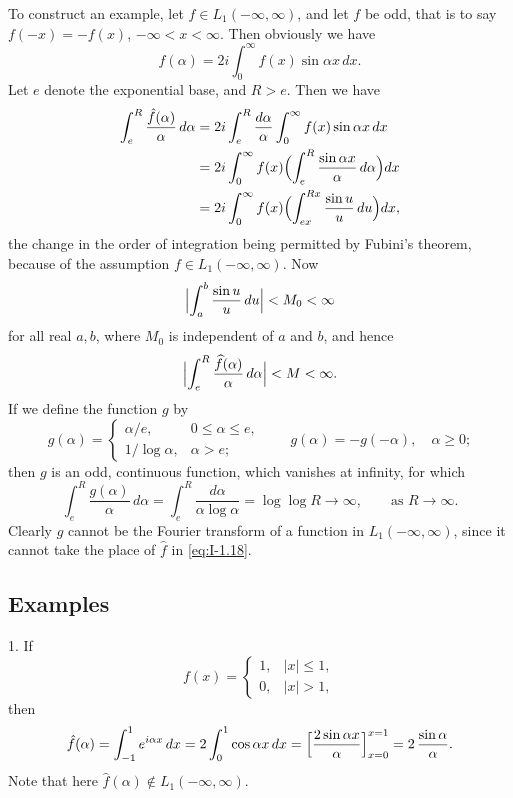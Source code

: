 To construct an example, let $f\in L_1(-\infty,\infty)$, and let $f$ be odd, that is to say $f(-x)=-f(x)$, $-\infty<x<\infty$. Then obviously we have
\begin{equation*}
\hat f(\alpha)=2i\int_0^\infty f(x)\sin\alpha x\,dx.
\end{equation*}
Let $e$ denote the exponential base, and $R>e$. Then we have
\begin{align*}
\int_e^R\frac{\hat f(\alpha)}{\alpha}\,d\alpha
&=2i\int_e^R\frac{d\alpha}{\alpha}\int_0^\infty f(x)\sin\alpha x\,dx\\
&=2i\int_0^\infty f(x)\Bigl(\int_e^R\frac{\sin\alpha x}{\alpha}\,d\alpha\Bigr)dx\\
&=2i\int_0^\infty f(x)\Bigl(\int_{ex}^{Rx}\frac{\sin u}{u}\,du\Bigr)dx,
\end{align*}
the change in the order of integration being permitted by Fubini's theorem, because of the assumption $f\in L_1(-\infty,\infty)$. Now
\begin{equation*}
\Bigl|\int_a^b\frac{\sin u}{u}\,du\Bigr|<M_0<\infty
\end{equation*}
for all real $a,b$, where $M_0$ is independent of $a$ and $b$, and hence
\begin{equation}\label{eq:I-1.18}
\Bigl|\int_e^R\frac{\widehat f(\alpha)}{\alpha}\,d\alpha\Bigr|<M<\infty.
\end{equation}
If we define the function $g$ by
\begin{equation*}
g(\alpha)=
\begin{cases}
\alpha/e,&0\le\alpha\le e,\\
1/\log\alpha,&\alpha>e;
\end{cases}
\qquad g(\alpha)=-g(-\alpha),\quad\alpha\ge 0;
\end{equation*}
then $g$ is an odd, continuous function, which vanishes at infinity, for which
\begin{equation*}
\int_e^R\frac{g(\alpha)}{\alpha}\,d\alpha
=\int_e^R\frac{d\alpha}{\alpha\log\alpha}
=\log\log R\to\infty,\qquad\text{as }R\to\infty.
\end{equation*}
Clearly $g$ cannot be the Fourier transform of a function in $L_1(-\infty,\infty)$, since it cannot take the place of $\hat f$ in \eqref{eq:I-1.18}.

\subsection*{Examples}
1. If
\begin{equation*}
f(x)=
\begin{cases}
1,&|x|\le 1,\\
0,&|x|>1,
\end{cases}
\end{equation*}
then
\begin{equation*}
\hat f(\alpha)=\int_{-1}^1 e^{i\alpha x}\,dx
=2\int_0^1\cos\alpha x\,dx
=\Bigl[\frac{2\sin\alpha x}{\alpha}\Bigr]_{x=0}^{x=1}
=2\,\frac{\sin\alpha}{\alpha}.
\end{equation*}
Note that here $\hat f(\alpha)\notin L_1(-\infty,\infty)$.


